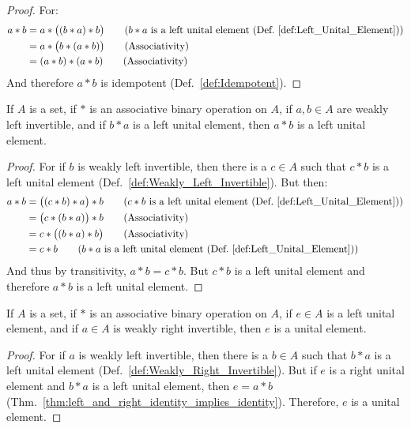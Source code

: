     \begin{proof}
        For:
        \begin{align}
            a*b&=a*\big((b*a)*b\big)
            \tag{$b*a$ is a left unital element %
                 (Def.~\ref{def:Left_Unital_Element})}\\
            &=a*\big(b*(a*b)\big)
            \tag{Associativity}\\
            &=(a*b)*(a*b)
            \tag{Associativity}
        \end{align}
        And therefore $a*b$ is idempotent (Def.~\ref{def:Idempotent}). 
    \end{proof}
    \begin{theorem}
        \label{thm:ba_left_unital_implies_ab_left_unital}%
        If $A$ is a set, if $*$ is an associative binary operation on $A$, if
        $a,b\in{A}$ are weakly left invertible, and if $b*a$ is a left unital
        element, then $a*b$ is a left unital element.
    \end{theorem}
    \begin{proof}
        For if $b$ is weakly left invertible, then there is a $c\in{A}$ such
        that $c*b$ is a left unital element
        (Def.~\ref{def:Weakly_Left_Invertible}). But then:
        \begin{align}
            a*b&=\big((c*b)*a\big)*b
            \tag{$c*b$ is a left unital element %
                (Def.~\ref{def:Left_Unital_Element})}\\
            &=\big(c*(b*a)\big)*b
            \tag{Associativity}\\
            &=c*\big((b*a)*b\big)
            \tag{Associativity}\\
            &=c*b
            \tag{$b*a$ is a left unital element %
                 (Def.~\ref{def:Left_Unital_Element})}
        \end{align}
        And thus by transitivity, $a*b=c*b$. But $c*b$ is a left unital element
        and therefore $a*b$ is a left unital element.
    \end{proof}
    \begin{theorem}
        If $A$ is a set, if $*$ is an associative binary operation on $A$, if
        $e\in{A}$ is a left unital element, and if $a\in{A}$ is weakly right
        invertible, then $e$ is a unital element.
    \end{theorem}
    \begin{proof}
        For if $a$ is weakly left invertible, then there is a $b\in{A}$ such
        that $b*a$ is a left unital element
        (Def.~\ref{def:Weakly_Right_Invertible}). But if $e$ is a right unital
        element and $b*a$ is a left unital element, then $e=a*b$
        (Thm.~\ref{thm:left_and_right_identity_implies_identity}). Therefore,
        $e$ is a unital element.
    \end{proof}
